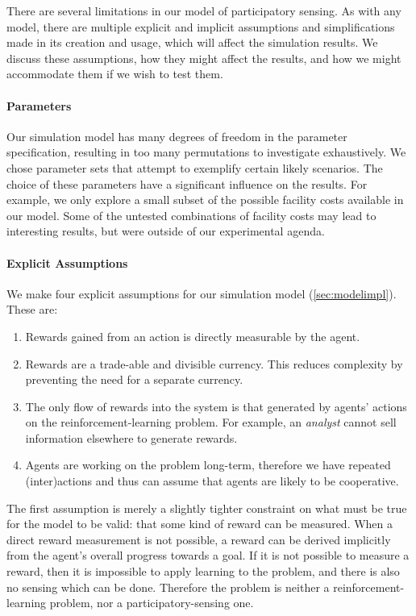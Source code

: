 There are several limitations in our model of participatory sensing. As with
any model, there are multiple explicit and implicit assumptions and
simplifications made in its creation and usage, which will affect the
simulation results. We discuss these assumptions, how they might affect the
results, and how we might accommodate them if we wish to test them.

\paragraph{Parameters} Our simulation model has many degrees of freedom in the
parameter specification, resulting in too many permutations to investigate
exhaustively. We chose parameter sets that attempt to exemplify certain likely
scenarios. The choice of these parameters have a significant influence on the
results. For example, we only explore a small subset of the possible facility costs
available in our model. Some of the untested combinations of facility costs may lead to interesting results, but were outside of our experimental agenda.

\paragraph{Explicit Assumptions}
We make four explicit assumptions for our simulation model (\autoref{sec:modelimpl}). These are:
\begin{enumerate}
\item Rewards gained from an action is directly measurable by the agent.
\item Rewards are a trade-able and divisible currency. This reduces complexity by preventing the need for a separate currency.
\item The only flow of rewards into the system is that generated by agents' actions on the reinforcement-learning problem. For example, an \emph{analyst} cannot sell information elsewhere to generate rewards.
\item Agents are working on the problem long-term, therefore we have repeated (inter)actions and thus can assume that agents are likely to be cooperative.
\end{enumerate}

The first assumption is merely a slightly tighter constraint on what must be true
for the model to be valid: that some kind of reward can be measured. When a
direct reward measurement is not possible, a reward can be derived implicitly
from the agent's overall progress towards a goal. If it is not possible to
measure a reward, then it is impossible to apply learning to the problem, and
there is also no sensing which can be done. Therefore the problem is neither a
reinforcement-learning problem, nor a participatory-sensing one.

